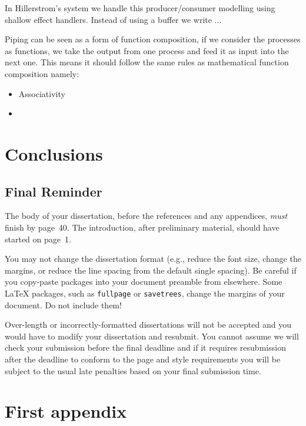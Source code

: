 \documentclass[logo,bsc,singlespacing,parskip]{infthesis}
\begin{document}
In Hillerstrom's system we handle this producer/consumer modelling using shallow effect handlers. Instead of using a buffer we write ...

Piping can be seen as a form of function composition, if we consider the processes as functions, we take the output from one process and feed it as input into the next one. This means it should follow the same rules as mathematical function composition namely:
\begin{itemize}
    \item Associativity
    \item 
\end{itemize}





\chapter{Conclusions}

\section{Final Reminder}

The body of your dissertation, before the references and any appendices,
\emph{must} finish by page~40. The introduction, after preliminary material,
should have started on page~1.

You may not change the dissertation format (e.g., reduce the font size, change
the margins, or reduce the line spacing from the default single spacing). Be
careful if you copy-paste packages into your document preamble from elsewhere.
Some \LaTeX{} packages, such as \texttt{fullpage} or \texttt{savetrees}, change
the margins of your document. Do not include them!

Over-length or incorrectly-formatted dissertations will not be accepted and you
would have to modify your dissertation and resubmit. You cannot assume we will
check your submission before the final deadline and if it requires resubmission
after the deadline to conform to the page and style requirements you will be
subject to the usual late penalties based on your final submission time.

% 




\appendix

\chapter{First appendix}
\end{document}

